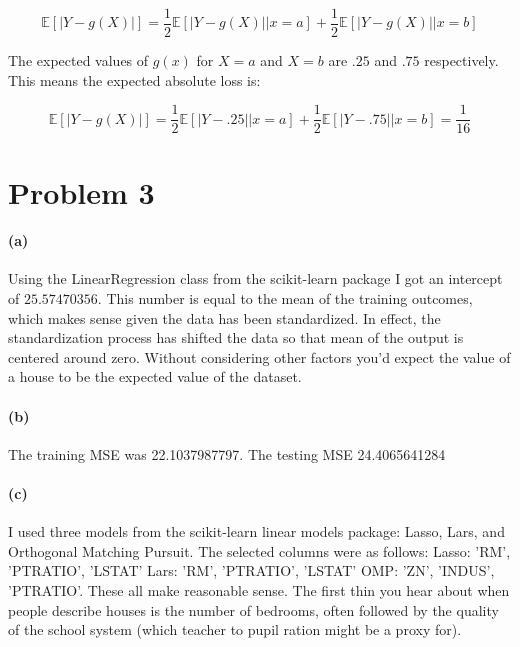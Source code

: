 \documentclass[twoside,11pt]{homework}
\begin{document}
$$ \mathbb{E}[|Y-g(X)|] = \frac{1}{2} \mathbb{E}[|Y − g(X)|| x = a] + \frac{1}{2} \mathbb{E}[|Y − g(X)|| x = b] $$

The expected values of $g(x)$ for $X = a$ and $X = b$ are $.25$ and $.75$ respectively.  This means the expected absolute loss is:

$$ \mathbb{E}[|Y-g(X)|] = \frac{1}{2} \mathbb{E}[|Y − .25|| x = a] + \frac{1}{2} \mathbb{E}[|Y − .75|| x = b]  = \frac{1}{16}$$


\section*{Problem 3}

\paragraph{(a)} Using the LinearRegression class from the scikit-learn package I got an intercept of $25.57470356$.  This number is equal to the mean of the training outcomes, which makes sense given the data has been standardized.  In effect, the standardization process has shifted the data so that mean of the output is centered around zero.  Without considering other factors you'd expect the value of a house to be the expected value of the dataset. 

\paragraph{(b)} The training MSE was 22.1037987797.  The testing MSE 24.4065641284

\paragraph{(c)} I used three models from the scikit-learn linear models package: Lasso, Lars, and Orthogonal Matching Pursuit.  The selected columns were as follows: 
Lasso: 'RM', 'PTRATIO', 'LSTAT' 
Lars: 'RM', 'PTRATIO', 'LSTAT' 
OMP: 'ZN', 'INDUS', 'PTRATIO'.  These all make reasonable sense.  The first thin you hear about when people describe houses is the number of bedrooms, often followed by the quality of the school system (which teacher to pupil ration might be a proxy for).
\end{document}
